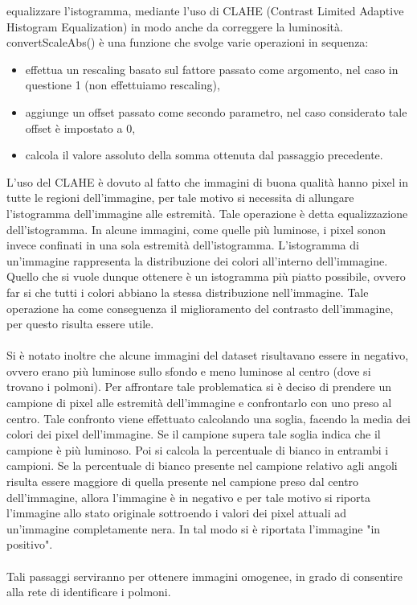 equalizzare l'istogramma, mediante l'uso di CLAHE (Contrast Limited Adaptive Histogram Equalization) in modo anche da correggere la luminosità.
convertScaleAbs() è una funzione che svolge varie operazioni in sequenza:
\begin{itemize}
    \item effettua un rescaling basato sul fattore passato come argomento, nel caso in questione 1 (non effettuiamo rescaling),
    \item aggiunge un offset passato come secondo parametro, nel caso considerato tale offset è impostato a 0,
    \item calcola il valore assoluto della somma ottenuta dal passaggio precedente.
\end{itemize}
L'uso del CLAHE è dovuto al fatto che immagini di buona qualità hanno pixel in tutte le regioni dell'immagine, per tale motivo si necessita di 
allungare l'istogramma dell'immagine alle estremità. Tale operazione è detta equalizzazione dell'istogramma. In alcune immagini, come quelle più luminose, 
i pixel sonon invece confinati in una sola estremità dell'istogramma. L'istogramma di un'immagine rappresenta la distribuzione dei colori all'interno dell'immagine.
Quello che si vuole dunque ottenere è un istogramma più piatto possibile, ovvero far si che tutti i colori abbiano la stessa distribuzione nell'immagine.
Tale operazione ha come conseguenza il miglioramento del contrasto dell'immagine, per questo risulta essere utile.
\\\\
Si è notato inoltre che alcune immagini del dataset risultavano essere in negativo, ovvero erano più luminose sullo sfondo e meno luminose al centro (dove si trovano i polmoni).
Per affrontare tale problematica si è deciso di prendere un campione di pixel alle estremità dell'immagine e confrontarlo con uno preso al centro.
Tale confronto viene effettuato calcolando una soglia, facendo la media dei colori dei pixel dell'immagine.
Se il campione supera tale soglia indica che il campione è più luminoso. Poi si calcola la percentuale di bianco in entrambi i campioni. 
Se la percentuale di bianco presente nel campione relativo agli angoli risulta essere maggiore di quella presente nel campione preso dal centro dell'immagine, allora 
l'immagine è in negativo e per tale motivo si riporta l'immagine allo stato originale sottroendo  i valori dei pixel attuali ad un'immagine completamente nera.
In tal modo si è riportata l'immagine "in positivo".
\\\\
Tali passaggi serviranno per ottenere immagini omogenee, in grado di consentire alla rete di identificare i polmoni.
